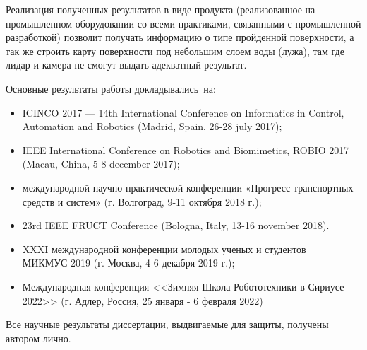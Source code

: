 {\influence} Реализация полученных результатов в виде продукта (реализованное на промышленном оборудовании со всеми практиками, связанными с промышленной разработкой) позволит получать информацию о типе пройденной поверхности, а так же строить карту поверхности под небольшим слоем воды (лужа), там где лидар и камера не смогут выдать адекватный результат.


{\probation}
Основные результаты работы докладывались~на:
\begin{itemize}
  \item ICINCO 2017 --- 14th International Conference on Informatics in Control, Automation and Robotics (Madrid, Spain, 26-28 july 2017);
  \item IEEE International Conference on Robotics and Biomimetics, ROBIO 2017 (Macau, China, 5-8 december 2017);
  \item  международной  научно-практической  конференции  «Прогресс  транспортных 
  средств и систем» (г. Волгоград, 9-11 октября 2018 г.);
  \item 23rd IEEE FRUCT Conference (Bologna, Italy, 13-16 november 2018).
  \item XXXI международной конференции молодых ученых и студентов МИКМУС-2019 
  (г. Москва, 4-6 декабря 2019 г.);
  \item Международная конференция <<Зимняя Школа Робототехники в Сириусе --- 2022>> (г. Адлер, Россия, 25 января - 6 февраля 2022)
\end{itemize}

{\contribution} Все научные результаты диссертации, выдвигаемые для защиты, получены автором лично.

